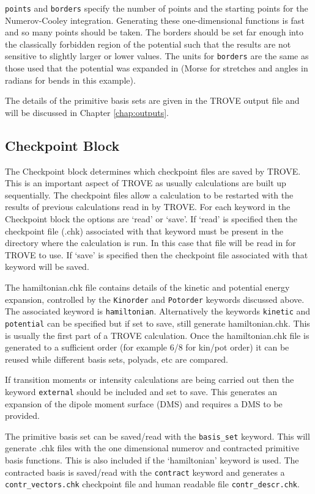 \verb|points| and \verb|borders| specify the number of points and the starting points for the Numerov-Cooley integration.
Generating these one-dimensional functions is fast and so many points should be taken. 
 The borders should be set far enough into the classically forbidden region of the potential such that 
 the results are not sensitive to slightly larger or lower values. The units for \verb|borders| are the same as those used
that the potential was expanded in (Morse for stretches and angles in radians for bends in this example).

The details of the primitive basis sets are given in the TROVE output file and will be discussed in 
Chapter \ref{chap:outputs}.

\subsection{Checkpoint Block}
The Checkpoint block determines which checkpoint files are saved by TROVE. 
This is an important aspect of TROVE as usually calculations are built up sequentially. 
The checkpoint files allow a calculation to be restarted with the results of previous calculations read in by TROVE. 
For each keyword in the Checkpoint block the options are `read' or `save'. 
If `read' is specified then the checkpoint file (.chk) associated with that keyword must be present in the directory 
where the calculation is run. 
In this case that file will be read in for TROVE to use. If `save' is specified then the checkpoint file associated with 
that keyword will be saved.

The hamiltonian.chk file contains details of the kinetic and potential energy expansion, controlled by the \verb|Kinorder| and 
\verb|Potorder| keywords discussed above. The associated keyword is \verb|hamiltonian|. 
Alternatively the keywords \verb|kinetic| and \verb|potential| can be specified 
but if set to save, still generate hamiltonian.chk. 
This is usually the first part of a TROVE calculation. Once the hamiltonian.chk file is generated to a sufficient order 
(for example 6/8 for kin/pot order) it can be reused while different basis sets, polyads, etc are compared. 

If transition moments or intensity calculations are being carried out then the keyword \verb|external| should be included 
and set to save. This generates an expansion of the dipole moment surface (DMS) and requires a DMS to be provided. 

The primitive basis set can be saved/read with the \verb|basis_set| keyword. This will generate .chk files with the
one dimensional numerov and contracted primitive basis functions. This is also included if the `hamiltonian' keyword is used. 
The contracted basis is saved/read with the \verb|contract| keyword and generates a \verb|contr_vectors.chk| 
checkpoint file and human readable file \verb|contr_descr.chk|.

